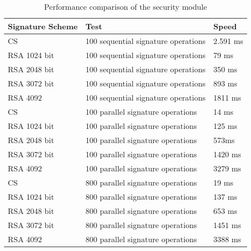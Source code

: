 \begin{table}[ht]
    \centering
    \setupBfhTabular
    \begin{tabular}{lll}
        \rowcolor{BFH-tablehead}
        \textbf{Signature Scheme} & \textbf{Test} & \textbf{Speed} \\\hline
        CS & 100 sequential signature operations & 2.591 ms \\\hline
        RSA 1024 bit & 100 sequential signature operations & 79 ms \\\hline
        RSA 2048 bit & 100 sequential signature operations & 350 ms \\\hline
        RSA 3072 bit & 100 sequential signature operations & 893 ms \\\hline
        RSA 4092 & 100 sequential signature operations & 1811 ms \\\hline
        \hline
        CS & 100 parallel signature operations & 14 ms \\\hline
        RSA 1024 bit & 100 parallel signature operations & 125 ms \\\hline
        RSA 2048 bit & 100 parallel signature operations & 573ms \\\hline
        RSA 3072 bit & 100 parallel signature operations & 1420 ms \\\hline
        RSA 4092 & 100 parallel signature operations & 3279 ms \\\hline
        \hline
        CS & 800 parallel signature operations & 19 ms \\\hline
        RSA 1024 bit & 800 parallel signature operations & 137 ms \\\hline
        RSA 2048 bit & 800 parallel signature operations & 653 ms \\\hline
        RSA 3072 bit & 800 parallel signature operations & 1451 ms \\\hline
        RSA 4092 & 800 parallel signature operations & 3388 ms \\\hline
    \end{tabular}
    \caption{Performance comparison of the security module}
    \label{tab:comp-sign-full}
\end{table}


